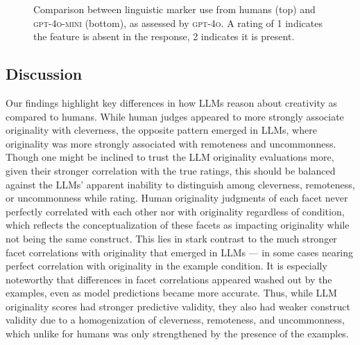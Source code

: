 \begin{figure*}[t]
    \centering
    \footnotesize
    \hspace{-2cm}
    \caption{Comparison between linguistic marker use from humans (top) and \textsc{gpt-4o-mini} (bottom), as assessed by \textsc{gpt-4o}. A rating of 1 indicates the feature is absent in the response, 2 indicates it is present.}
    \label{fig:liwc_analysis}
\end{figure*}

\subsection{Discussion}
Our findings highlight key differences in how LLMs reason about creativity as compared to humans. While human judges appeared to more strongly associate originality with cleverness, the opposite pattern emerged in LLMs, where originality was more strongly associated with remoteness and uncommonness. Though one might be inclined to trust the LLM originality evaluations more, given their stronger correlation with the true ratings, this should be balanced against the LLMs' apparent inability to distinguish among cleverness, remoteness, or uncommonness while rating. Human originality judgments of each facet never perfectly correlated with each other nor with originality regardless of condition, which reflects the conceptualization of these facets as impacting originality while not being the same construct. This lies in stark contrast to the much stronger facet correlations with originality that emerged in LLMs --- in some cases nearing perfect correlation with originality in the example condition. It is especially noteworthy that differences in facet correlations appeared washed out by the examples, even as model predictions became more accurate. Thus, while LLM originality scores had stronger predictive validity, they also had weaker construct validity due to a homogenization of cleverness, remoteness, and uncommonness, which unlike for humans was only strengthened by the presence of the examples. 

